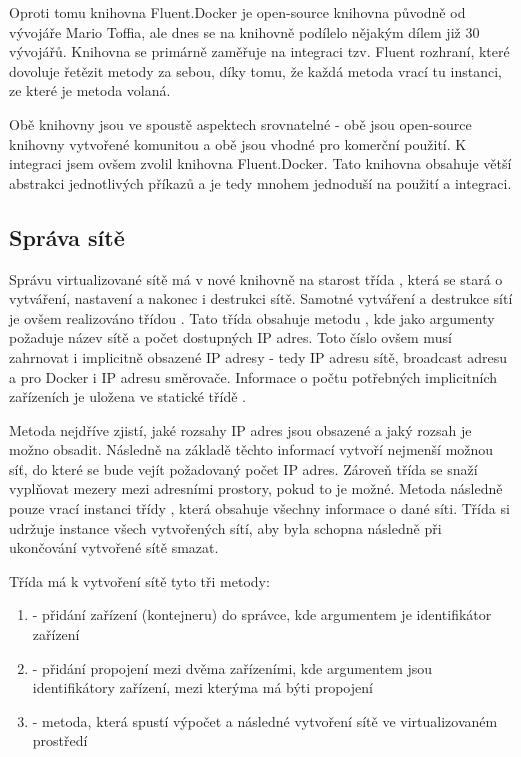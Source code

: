 Oproti tomu knihovna Fluent.Docker je open-source knihovna původně od vývojáře Mario Toffia, ale dnes se na knihovně podílelo nějakým dílem již 30 vývojářů. Knihovna se primárně zaměřuje na integraci tzv. Fluent rozhraní, které dovoluje řetězit metody za sebou, díky tomu, že každá metoda vrací tu instanci, ze které je metoda volaná. \cite{fluentinterface}

Obě knihovny jsou ve spoustě aspektech srovnatelné - obě jsou open-source knihovny vytvořené komunitou a obě jsou vhodné pro komerční použití. K integraci jsem ovšem zvolil knihovna Fluent.Docker. Tato knihovna obsahuje větší abstrakci jednotlivých příkazů a je tedy mnohem jednoduší na použití a integraci.

\subsection{Správa sítě}

Správu virtualizované sítě má v nové knihovně na starost třída , která se stará o vytváření, nastavení a nakonec i destrukci sítě. 
Samotné vytváření a destrukce sítí je ovšem realizováno třídou . Tato třída obsahuje metodu , kde jako argumenty požaduje název sítě a počet dostupných IP adres. Toto číslo ovšem musí zahrnovat i implicitně obsazené IP adresy - tedy IP adresu sítě, broadcast adresu a pro Docker i IP adresu směrovače. Informace o počtu potřebných implicitních zařízeních je uložena ve statické třídě .

Metoda  nejdříve zjistí, jaké rozsahy IP adres jsou obsazené a jaký rozsah je možno obsadit. Následně na základě těchto informací vytvoří nejmenší možnou síť, do které se bude vejít požadovaný počet IP adres. Zároveň třída se snaží vyplňovat mezery mezi adresními prostory, pokud to je možné. Metoda následně pouze vrací instanci třídy , která obsahuje všechny informace o dané síti. Třída  si udržuje instance všech vytvořených sítí, aby byla schopna následně při ukončování vytvořené sítě smazat. 

Třída  má k vytvoření sítě tyto tři metody:

\begin{enumerate}
    \item {} - přidání zařízení (kontejneru) do správce, kde argumentem je identifikátor zařízení
    \item {} - přidání propojení mezi dvěma zařízeními, kde argumentem jsou identifikátory zařízení, mezi kterýma má býti propojení
    \item {} - metoda, která spustí výpočet a následné vytvoření sítě ve virtualizovaném prostředí
\end{enumerate}

